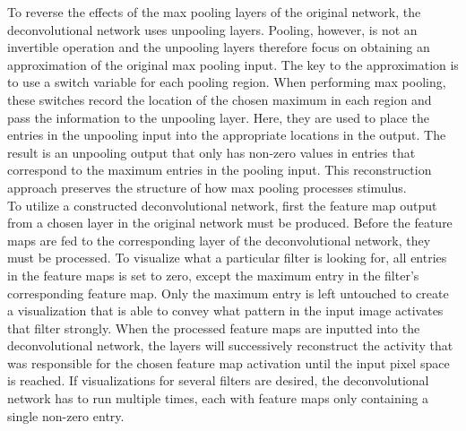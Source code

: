 \noindent To reverse the effects of the max pooling layers of the original network, the deconvolutional network uses unpooling layers. Pooling, however, is not an invertible operation and the unpooling layers therefore focus on obtaining an approximation of the original max pooling input. The key to the approximation is to use a switch variable for each pooling region. When performing max pooling, these switches record the location of the chosen maximum in each region and pass the information to the unpooling layer. Here, they are used to place the entries in the unpooling input into the appropriate locations in the output. The result is an unpooling output that only has non-zero values in entries that correspond to the maximum entries in the pooling input. This reconstruction approach preserves the structure of how max pooling processes stimulus. \\

\noindent To utilize a constructed deconvolutional network, first the feature map output from a chosen layer in the original network must be produced. Before the feature maps are fed to the corresponding layer of the deconvolutional network, they must be processed. To visualize what a particular filter is looking for, all entries in the feature maps is set to zero, except the maximum entry in the filter's corresponding feature map. Only the maximum entry is left untouched to create a visualization that is able to convey what pattern in the input image activates that filter strongly. When the processed feature maps are inputted into the deconvolutional network, the layers will successively reconstruct the activity that was responsible for the chosen feature map activation until the input pixel space is reached. If visualizations for several filters are desired, the deconvolutional network has to run multiple times, each with feature maps only containing a single non-zero entry. \\

